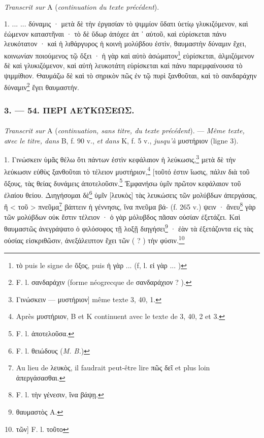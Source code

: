 \documentclass[a4paper, 11pt, oneside, polutonikogreek, french]{article}
\begin{document}
\paragraph{}
\emph{Transcrit sur} A (\emph{continuation du texte précédent}).

\bigskip

1. ... ... δύναμις · μετὰ δὲ τὴν ἐργασίαν τὸ ψιμμίον ὕδατι ὑετίῳ γλυκιζόμενον, καὶ ἐώμενον καταστῆναι · τὸ δὲ ὕδωρ ἀπόχεε ἀπ ᾽ αὐτοῦ, καὶ εὑρίσκεται πάνυ λευκότατον · καὶ ἡ λιθάργυρος ἡ κοινὴ μολύβδου ἐστὶν, θαυμαστὴν δύναμιν ἔχει, κοινωνίαν ποιούμενος τῷ ὄξει · ἡ γὰρ καὶ αὐτὸ ἀσώματον\footnote{τὸ puis le signe de ὄξος, puis ἡ γὰρ ... (f, l. εἰ γὰρ ... )} εὑρίσκεται, ἁλμιζόμενον δὲ καὶ γλυκιζόμενον, καὶ αὐτὴ λευκοτάτη εὑρίσκεται καὶ πάνυ παρεμφαίνουσα τὸ ψιμμίθιον. Θαυμάζω δὲ καὶ τὸ σηρικὸν πῶς ἐν τῷ πυρὶ ξανθοῦται, καὶ τὸ σανδαράχην δύναμιν\footnote{F. l. σανδαράχιν (forme néogrecque de σανδαράχιον ? ).} ἔγει θαυμαστήν.

\bigskip
\centerline{\EightStarTaper}
\centerline{\EightStarTaper\EightStarTaper}
\bigskip

\subsubsection{3. --- 54. ΠΕΡΙ ΛΕΥΚΩΣΕΩΣ.}
\paragraph{}
\emph{Transcrit sur} A (\emph{continuation, sans titre, du texte précédent}). --- \emph{Même texte, aνec le titre, dans} B, f. 90 v., \emph{et dans} K, f. 5 v., \emph{jusqu'à} μυστήριον (ligne 3).

\bigskip

1. Γινώσκειν ὑμᾶς θέλω ὅτι πάντων ἐστὶν κεφάλαιον ἡ λεύκωσις,\footnote{Γινώσκειν --- μυστήριον] même texte 3, 40, 1.} μετὰ δὲ τὴν λεύκωσιν εὐθὺς ξανθοῦται τὸ τέλειον μυστήριον,\footnote{Après μυστήριον, B et K continuent avec le texte de 3, 40, 2 et 3.} [τοῦτό ἐστιν ἴωσις, πάλιν διὰ τοῦ ὄξους, τὰς θείας δυνάμεις ἀποτελοῦσιν.\footnote{F. l. ἀποτελοῦσα.} Ἐμφανήσω ὑμῖν πρῶτον κεφάλαιον τοῦ ἐλαίου θείου. Διηγήσομαι δὲ\footnote{F. l. θειώδους (\emph{M. B.})} ὑμῖν [λευκὸς] τὰς λευκώσεις τῶν μολύβδων ἀπεργάσας, ἢ < τοῦ > πνεῦμα\footnote{Au lieu de λευκὸς, il faudrait peut-être lire πῶς δεῖ et plus loin ἀπεργάσασθαι.} βάπτειν ἡ γέννησις, ἵνα πνεῦμα βά- (f. 265 v.) ψειν · ἄνευ\footnote{F. l. τὴν γένεσιν, ἵνα βάψῃ.} γὰρ τῶν μολύβδων οὐκ ἔστιν τέλειον · ὁ γὰρ μόλυβδος πᾶσαν οὐσίαν ἐξετάζει. Καὶ θαυμαστῶς ἀνεγράψατο ὁ φιλόσοφος τῇ λοξῇ διηγήσει\footnote{θαυμαστὸς A.} · ἐὰν τὰ ἐξετάζοντα εἰς τὰς οὐσίας εἰσκριθῶσιν, ἀνεξάλειπτον ἔχει τῶν ( ? ) τὴν φύσιν.\footnote{τῶν] F. l. τοῦτο}
\end{document}
